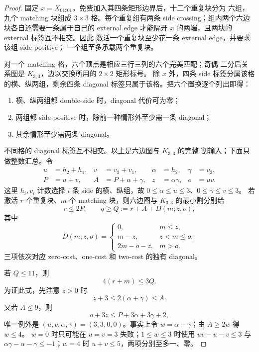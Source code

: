 \begin{proof}
固定 \(x=X_{01;01}\)。免费加入其四条矩形边界后，十二个重复块分为
六组，九个 matching 块组成 \(3\times3\) 格。每个重复组有两条
side crossing；组内两个六边块各自还需要一条属于自己的 external
edge 才能隔开 \(x\) 的两端，且两块的 external 标签互不相交。因此
激活一个重复块至少花一条 external edge，并要求该组 side-positive；
一个组至多承载两个重复块。

对一个 matching 格，六个顶点是相应三行三列的六个完美匹配；奇偶
二分后关系图是 \(K_{3,3}\)，边以交换所用的 \(2\times2\) 矩形标号。
除 \(x\) 外，四条 side 标签分属该格的横、纵两组，剩余四条
diagonal 标签只属于该格。把六个置换逐个列出即得：
\begin{enumerate}[label=(\roman*),leftmargin=2.4em]
\item 横、纵两组都 double-side 时，diagonal 代价可为零；
\item 两组都 side-positive 时，除前一种情形外至少需一条 diagonal；
\item 其余情形至少需两条 diagonal。
\end{enumerate}
不同格的 diagonal 标签互不相交。以上是六边图与 \(K_{3,3}\) 的完整
割输入；下面只做整数汇总。令
\[
\begin{aligned}
u&=h_2+h_1,& v&=v_2+v_1,&
\alpha&=h_2,& \gamma&=v_2,\\
P&=u+v,& A&=P+\alpha+\gamma,&
z&=\alpha\gamma,& o&=uv.
\end{aligned}
\]
这里 \(h_i,v_i\) 计数选择 \(i\) 条 side 的横、纵组，故
\(0\le\alpha\le u\le3\)、\(0\le\gamma\le v\le3\)。
若激活 \(r\) 个重复块、\(m\) 个 matching 块，则六边图与
\(K_{3,3}\) 的最小割分别给
\[
r\le2P,\qquad
q\ge Q:=r+A+D(m;z,o),                                      \tag{CM1}
\]
其中
\[
D(m;z,o)=
\begin{cases}
0,&m\le z,\\
m-z,&z<m\le o,\\
2m-o-z,&m>o.
\end{cases}                                                   \tag{CM2}
\]
三项依次对应 zero-cost、one-cost 和 two-cost 的独有 diagonal。

若 \(Q\le11\)，则
\begin{equation}\label{n5:eq:density}
4(r+m)\le3Q.
\end{equation}
为证此式，先注意 \(z>0\) 时
\[
z+3\le2(\alpha+\gamma)\le A.                                \tag{CM3}
\]
又若 \(A\le9\)，则
\[
o+3z\le P+3\alpha+3\gamma+2,                                \tag{CM4}
\]
唯一例外是 \((u,v,\alpha,\gamma)=(3,3,0,0)\)。事实上令
\(w=\alpha+\gamma\)；由 \(A\ge2w\) 得 \(w\le4\)。
\(w=0\) 时只可能在 \(u=v=3\) 失败；\(1\le w\le3\) 时使用
\(uv-u-v\le3\) 与
\(\alpha\gamma-\alpha-\gamma\le-1\)；\(w=4\) 时
\(u+v\le5\)，两项分别至多一、零。


\end{proof}

